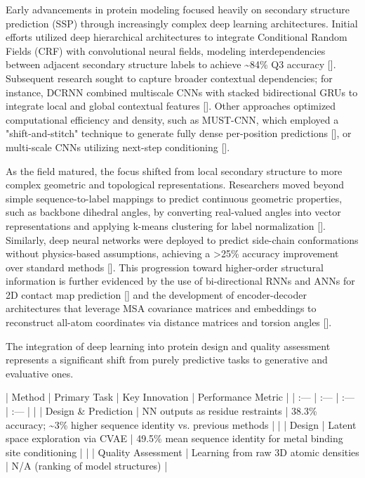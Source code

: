 \documentclass[11pt]{article}
\begin{document}
Early advancements in protein modeling focused heavily on secondary structure prediction (SSP) through increasingly complex deep learning architectures. Initial efforts utilized deep hierarchical architectures to integrate Conditional Random Fields (CRF) with convolutional neural fields, modeling interdependencies between adjacent secondary structure labels to achieve \textasciitilde{}84\% Q3 accuracy [\citep{1512.00843}]. Subsequent research sought to capture broader contextual dependencies; for instance, DCRNN combined multiscale CNNs with stacked bidirectional GRUs to integrate local and global contextual features [\citep{1604.07176}]. Other approaches optimized computational efficiency and density, such as MUST-CNN, which employed a "shift-and-stitch" technique to generate fully dense per-position predictions [\citep{1605.03004}], or multi-scale CNNs utilizing next-step conditioning [\citep{1611.01503}].

As the field matured, the focus shifted from local secondary structure to more complex geometric and topological representations. Researchers moved beyond simple sequence-to-label mappings to predict continuous geometric properties, such as backbone dihedral angles, by converting real-valued angles into vector representations and applying k-means clustering for label normalization [\citep{1712.07244}]. Similarly, deep neural networks were deployed to predict side-chain conformations without physics-based assumptions, achieving a >25\% accuracy improvement over standard methods [\citep{1707.08381}]. This progression toward higher-order structural information is further evidenced by the use of bi-directional RNNs and ANNs for 2D contact map prediction [\citep{1906.04527}] and the development of encoder-decoder architectures that leverage MSA covariance matrices and embeddings to reconstruct all-atom coordinates via distance matrices and torsion angles [\citep{1911.05531}].

The integration of deep learning into protein design and quality assessment represents a significant shift from purely predictive tasks to generative and evaluative ones.

| Method | Primary Task | Key Innovation | Performance Metric |
| :--- | :--- | :--- | :--- |
| \citep{1801.07130} | Design \& Prediction | NN outputs as residue restraints | 38.3\% accuracy; \textasciitilde{}3\% higher sequence identity vs. previous methods |
| \citep{1806.09900} | Design | Latent space exploration via CVAE | 49.5\% mean sequence identity for metal binding site conditioning |
| \citep{1801.06252} | Quality Assessment | Learning from raw 3D atomic densities | N/A (ranking of model structures) |
\end{document}
